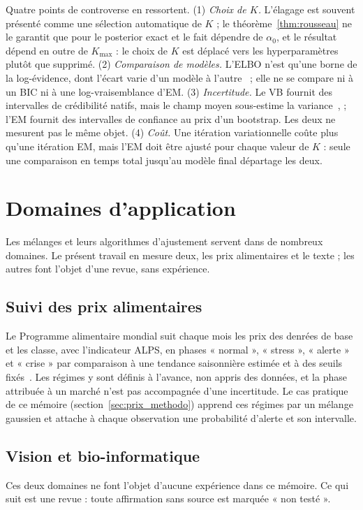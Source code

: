Quatre points de controverse en ressortent. (1) \emph{Choix de $K$.} L'élagage est souvent présenté comme une sélection automatique de $K$ ; le théorème~\ref{thm:rousseau} ne le garantit que pour le posterior exact et le fait dépendre de $\alpha_0$, et le résultat dépend en outre de $K_{\max}$ : le choix de $K$ est déplacé vers les hyperparamètres plutôt que supprimé. (2) \emph{Comparaison de modèles.} L'ELBO n'est qu'une borne de la log-évidence, dont l'écart varie d'un modèle à l'autre~\cite{corduneanu2001} ; elle ne se compare ni à un BIC ni à une log-vraisemblance d'EM. (3) \emph{Incertitude.} Le VB fournit des intervalles de crédibilité natifs, mais le champ moyen sous-estime la variance~\cite[section~10.1.2]{bishop2006}, \cite{blei2017} ; l'EM fournit des intervalles de confiance au prix d'un bootstrap. Les deux ne mesurent pas le même objet. (4) \emph{Coût.} Une itération variationnelle coûte plus qu'une itération EM, mais l'EM doit être ajusté pour chaque valeur de $K$ : seule une comparaison en temps total jusqu'au modèle final départage les deux.

\section{Domaines d'application}\label{sec:portee}
Les mélanges et leurs algorithmes d'ajustement servent dans de nombreux domaines. Le présent travail en mesure deux, les prix alimentaires et le texte ; les autres font l'objet d'une revue, sans expérience.

\subsection{Suivi des prix alimentaires}\label{sec:ea_prix}
Le Programme alimentaire mondial suit chaque mois les prix des denrées de base et les classe, avec l'indicateur ALPS, en phases « normal », « stress », « alerte » et « crise » par comparaison à une tendance saisonnière estimée et à des seuils fixés~\cite{pam2014alps}. Les régimes y sont définis à l'avance, non appris des données, et la phase attribuée à un marché n'est pas accompagnée d'une incertitude. Le cas pratique de ce mémoire (section~\ref{sec:prix_methodo}) apprend ces régimes par un mélange gaussien et attache à chaque observation une probabilité d'alerte et son intervalle.


\subsection{Vision et bio-informatique}\label{sec:vision_et_bio_informatique_revue}
Ces deux domaines ne font l'objet d'aucune expérience dans ce mémoire. Ce qui suit est une revue : toute affirmation sans source est marquée « non testé ».

